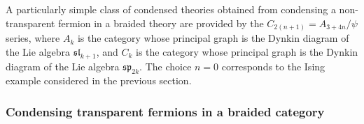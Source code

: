 \documentclass[12pt,a4paper]{article}
\newcommand{\kw}[1]{{\color{kwcolor}\footnotesize{(KW) #1}}}
\newcommand{\dave}[1]{{\color{ao(english)}\footnotesize{(DA) #1}}}
\newcommand{\ethan}[1]{{\color{amethyst}\footnotesize{(EL) #1}}}
\begin{document}
\medskip


A particularly simple class of condensed theories obtained from condensing a non-
transparent fermion in a braided theory are provided by the $C_{2(n+1)} = A_{3+4n} / \psi$ series, 
where $A_k$ is the category whose principal graph is the Dynkin diagram of the Lie algebra $\mathfrak{sl}_{k+1}$, 
and $C_k$ is the category whose principal graph is the Dynkin 
diagram of the Lie algebra $\mathfrak{sp}_{2k}$.
The choice $n=0$ 
corresponds to the Ising example considered in the previous section. 


\subsubsection{Condensing transparent fermions in a braided category}
\label{condense_transparent_fermion}
\end{document}
